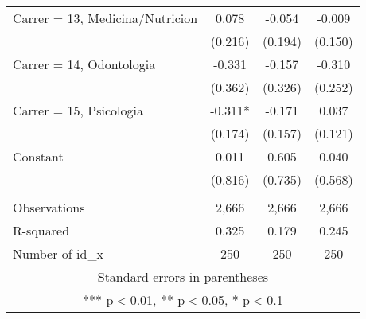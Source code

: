 \documentclass[]{article}
\begin{document}
\begin{tabular}{lccc}
Carrer = 13, Medicina/Nutricion & 0.078 & -0.054 & -0.009 \\
 & (0.216) & (0.194) & (0.150) \\
Carrer = 14, Odontologia & -0.331 & -0.157 & -0.310 \\
 & (0.362) & (0.326) & (0.252) \\
Carrer = 15, Psicologia & -0.311* & -0.171 & 0.037 \\
 & (0.174) & (0.157) & (0.121) \\
Constant & 0.011 & 0.605 & 0.040 \\
 & (0.816) & (0.735) & (0.568) \\
 &  &  &  \\
Observations & 2,666 & 2,666 & 2,666 \\
R-squared & 0.325 & 0.179 & 0.245 \\
 Number of id\_x & 250 & 250 & 250 \\ \hline
\multicolumn{4}{c}{ Standard errors in parentheses} \\
\multicolumn{4}{c}{ *** p$<$0.01, ** p$<$0.05, * p$<$0.1} \\
\end{tabular}
\end{document}

